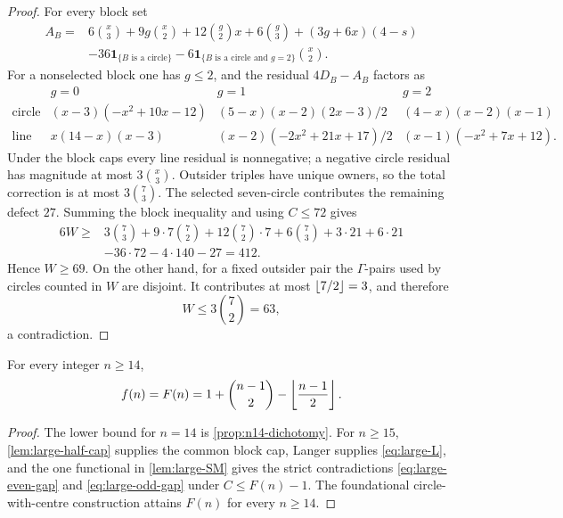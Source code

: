 \begin{proof}
For every block set
\begin{align*}
 A_B={}&6\binom x3+9g\binom x2+12\binom g2x+6\binom g3
 +(3g+6x)(4-s)\\
 &-36\mathbf{1}_{\{B\text{ is a circle}\}}
 -6\mathbf{1}_{\{B\text{ is a circle and }g=2\}}\binom x2.
\end{align*}
For a nonselected block one has $g\leq2$, and the residual $4D_B-A_B$
factors as
\begin{equation}
\begin{array}{c|ccc}
&g=0&g=1&g=2\\ \hline
\text{circle}&(x-3)(-x^2+10x-12)&
 (5-x)(x-2)(2x-3)/2&(4-x)(x-2)(x-1)\\
\text{line}&x(14-x)(x-3)&
 (x-2)(-2x^2+21x+17)/2&(x-1)(-x^2+7x+12).
\end{array}                                                     \label{eq:n14-residuals}
\end{equation}
Under the block caps every line residual is nonnegative; a negative circle
residual has magnitude at most $3\binom x3$.  Outsider triples have unique
owners, so the total correction is at most $3\binom73$.  The selected
seven-circle contributes the remaining defect $27$.  Summing the block
inequality and using $C\leq72$ gives
\begin{align*}
 6W\geq{}&3\binom73+9\cdot7\binom72
 +12\binom72\cdot7+6\binom73+3\cdot21+6\cdot21\\
 &-36\cdot72-4\cdot140-27=412.
\end{align*}
Hence $W\geq69$.  On the other hand, for a fixed outsider pair the
$\Gamma$-pairs used by circles counted in $W$ are disjoint.  It contributes
at most $\left\lfloor 7/2\right\rfloor=3$, and therefore
\[
 W\leq3\binom72=63,
\]
a contradiction.
\end{proof}

\begin{theorem}\label{thm:large-range}
For every integer $n\geq14$,
\[
 f(n)=F(n)=1+\binom{n-1}{2}-\left\lfloor \frac{n-1}{2}\right\rfloor.
\]
\end{theorem}

\begin{proof}
The lower bound for $n=14$ is \cref{prop:n14-dichotomy}.  For $n\geq15$,
\cref{lem:large-half-cap} supplies the common block cap, Langer supplies
\eqref{eq:large-L}, and the one functional in \cref{lem:large-SM} gives
the strict contradictions \eqref{eq:large-even-gap} and
\eqref{eq:large-odd-gap} under $C\leq F(n)-1$.  The foundational
circle-with-centre construction attains $F(n)$ for every $n\geq14$.
\end{proof}

